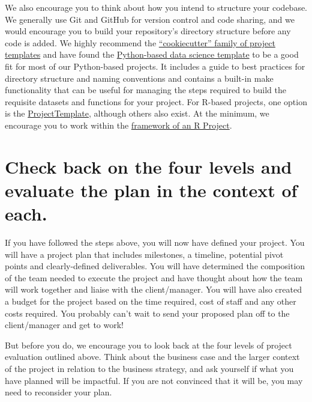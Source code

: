 \documentclass[
]{book}
\begin{document}
We also encourage you to think about how you intend to structure your
codebase. We generally use Git and GitHub for version control and code
sharing, and we would encourage you to build your repository's directory
structure before any code is added. We highly recommend the
\href{https://github.com/cookiecutter/cookiecutter}{``cookiecutter''
family of project templates} and have found the
\href{http://drivendata.github.io/cookiecutter-data-science/}{Python-based
data science template} to be a good fit for most of our Python-based
projects. It includes a guide to best practices for directory structure
and naming conventions and contains a built-in make functionality that
can be useful for managing the steps required to build the requisite
datasets and functions for your project. For R-based projects, one
option is the \href{http://projecttemplate.net/}{ProjectTemplate},
although others also exist. At the minimum, we encourage you to work
within the
\href{https://support.rstudio.com/hc/en-us/articles/200526207-Using-Projects}{framework
of an R Project}.

\hypertarget{check-back-on-the-four-levels-and-evaluate-the-plan-in-the-context-of-each.}{%
\section{Check back on the four levels and evaluate the plan in the
context of
each.}\label{check-back-on-the-four-levels-and-evaluate-the-plan-in-the-context-of-each.}}

If you have followed the steps above, you will now have defined your
project. You will have a project plan that includes milestones, a
timeline, potential pivot points and clearly-defined deliverables. You
will have determined the composition of the team needed to execute the
project and have thought about how the team will work together and
liaise with the client/manager. You will have also created a budget for
the project based on the time required, cost of staff and any other
costs required. You probably can't wait to send your proposed plan off
to the client/manager and get to work!

But before you do, we encourage you to look back at the four levels of
project evaluation outlined above. Think about the business case and the
larger context of the project in relation to the business strategy, and
ask yourself if what you have planned will be impactful. If you are not
convinced that it will be, you may need to reconsider your plan.
\end{document}
